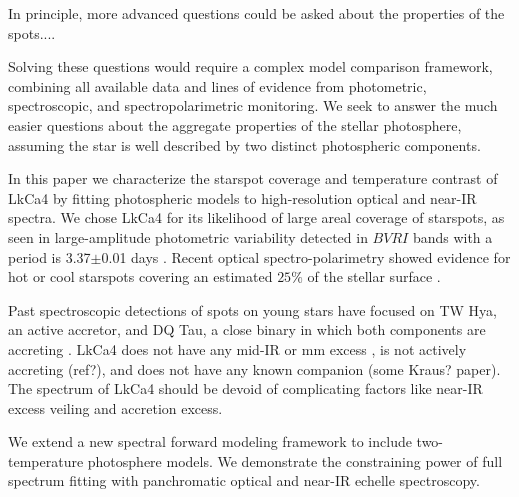 \documentclass[twocolumn]{emulateapj}%
\newcommand{\name}{LkCa4 }
\begin{document}

In principle, more advanced questions could be asked about the properties of the spots....  

Solving these questions would require a complex model comparison framework, combining all available data and lines of evidence from photometric, spectroscopic, and spectropolarimetric monitoring.  We seek to answer the much easier questions about the aggregate properties of the stellar photosphere, assuming the star is well described by two distinct photospheric components.  

\todo{Previous studies of \name}

In this paper we characterize the starspot coverage and temperature contrast of \name by fitting photospheric models to high-resolution optical and near-IR spectra.  We chose \name for its likelihood of large areal coverage of starspots, as seen in large-amplitude photometric variability  detected in $BVRI$ bands with a period is 3.37$\pm$0.01 days \citep{vrba93,grankin94,grankin08,xiao12}.  Recent optical spectro-polarimetry showed evidence for hot or cool starspots covering an estimated $25\%$ of the stellar surface \citep{donati14}.  


Past spectroscopic detections of spots on young stars have focused on TW Hya, an active accretor, and DQ Tau, a close binary in which both components are accreting \citep{debes13,bary14}.  \name does not have any mid-IR or mm excess \citep[e.g.][]{furlan06}, is not actively accreting (ref?), and does not have any known companion (some Kraus? paper).  The spectrum of \name should be devoid of complicating factors like near-IR excess veiling and accretion excess.  



We extend a new spectral forward modeling framework to include two-temperature photosphere models.  We demonstrate the constraining power of full spectrum fitting with panchromatic optical and near-IR echelle spectroscopy.
\end{document}
